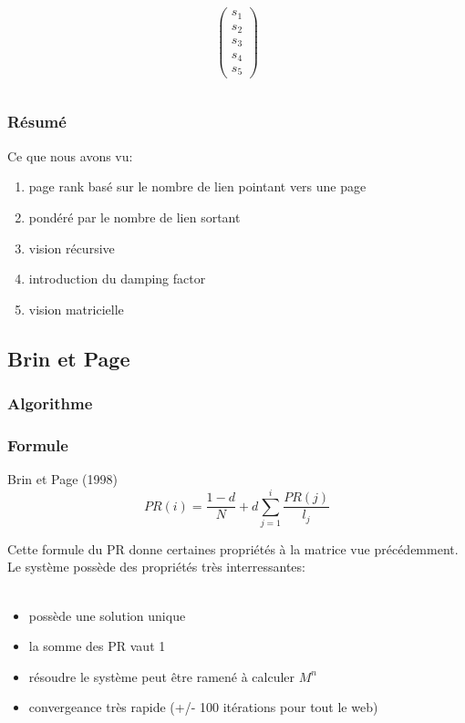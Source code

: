 \documentclass{beamer}
\begin{document}
\begin{frame}
\begin{columns}
    \begin{column}[r]{0.3\linewidth}
      \begin{minipage}{0.3\linewidth}
        \[ \left(
          \begin{array}{ c }
            s_1 \\
            s_2 \\
            s_3 \\
            s_4 \\
            s_5
          \end{array} \right)
        \]
      \end{minipage}
    \end{column}

  \end{columns}
  
\end{frame}


\begin{frame}
  \frametitle{Résumé}
  
  Ce que nous avons vu:
  
  \begin{enumerate}
    \item page rank basé sur le nombre de lien pointant vers une page
      \pause
    \item pondéré par le nombre de lien sortant
      \pause
    \item vision récursive
      \pause
    \item introduction du damping factor
      \pause
    \item vision matricielle
  \end{enumerate}

\end{frame}

\subsection{Brin et Page}

\begin{frame}
  \frametitle{Algorithme}
  \frametitle{Formule}
  \begin{block}{Brin et Page (1998)}
    \[PR(i) = \frac{1 - d}{N} + d \sum_{j=1}^i {\frac{PR(j)}{l_j}}\]
  \end{block}

  Cette formule du PR donne certaines propriétés à la matrice vue
  précédemment. Le système possède des propriétés très interressantes:\\\ \\
  \begin{itemize}
    \item possède une solution unique
    \item la somme des PR vaut 1
    \item résoudre le système peut être ramené à calculer $M^n$
    \item convergeance très rapide (+/- 100 itérations pour tout le web)
  \end{itemize}

\end{frame}
\end{document}
